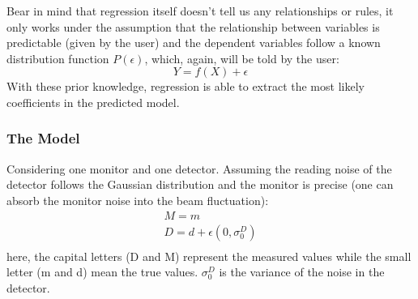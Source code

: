 Bear in mind that regression itself doesn't tell us any relationships or rules, 
it only works under
the assumption that the relationship between variables is predictable (given by the user) 
and the dependent variables follow a known distribution function $P(\epsilon)$, which,
again, will be told by the user:
$$ Y = f(X) + \epsilon $$
With these prior knowledge, regression is able to extract the most likely 
coefficients in the predicted model.

\begin{comment}
For example, the famous least square fit is actually a linear regression 
$$ Y = c_0 + \sum c_i x_i + \epsilon $$
assuming Gaussian distribution of the dependent variable: $\epsilon \sim N(0, \sigma)$
Another frequenctly used scene is logistic regression for classification, which
is very similar to linear regression except f(X) will be converted into a
probability function, e.g. using the logistic function:
$$ h(z) = \frac{e^z}{1 + e^z} \quad z = f(X) $$

The assumpsion we made here is that the fluctuations in beam parameters in small, 
compared to their normal yield -- this can be verified by their yield plot. So
that we can use first order fit to model the detector's response to change in
beam parameters. Therefore the `true' asymmetry will be:
\begin{equation}
    \CA_{cor} = \CA_{raw} - \sum_i \beta_i\Delta M_i
\end{equation}
where $\CA_{cor}$ is the corrected asymmetry, $\beta_i = \frac{\partial \CA_{raw}}{\Delta M_i}$ 
is the slope and $\Delta M$ is the difference of BPM yield bewtween 
opposite helicities windows, i sums over all 5 chosen BPMs.
\end{comment}

\subsubsection{The Model}
Considering one monitor and one detector. Assuming the reading noise of the detector
follows the Gaussian distribution and the monitor is precise (one can absorb the monitor
noise into the beam fluctuation):
\begin{equation}
    \begin{gathered}
	M = m	\\
	D = d + \epsilon(0, \sigma_0^D)    \\
    \end{gathered}
\end{equation}
here, the capital letters (D and M) represent the measured values while the 
small letter (m and d) mean the true values. $\sigma_0^D$ 
is the variance of the noise in the detector.

